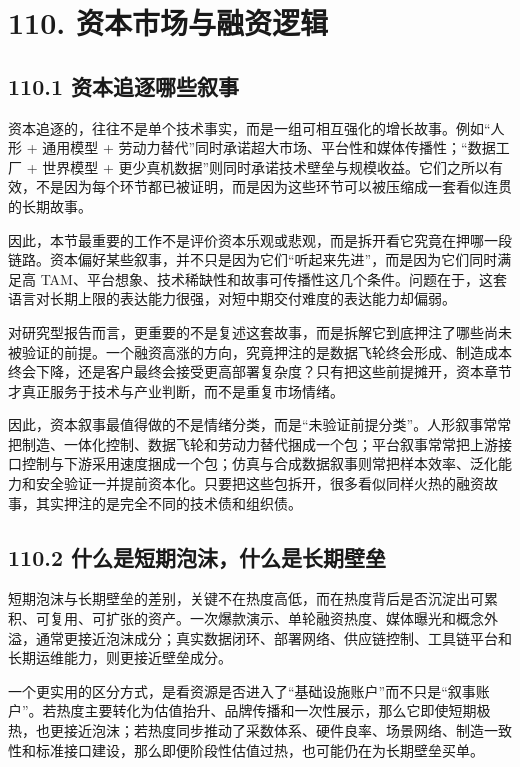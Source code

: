 \chapter*{110. 资本市场与融资逻辑}

\section*{110.1 资本追逐哪些叙事}


资本追逐的，往往不是单个技术事实，而是一组可相互强化的增长故事。例如“人形 + 通用模型 + 劳动力替代”同时承诺超大市场、平台性和媒体传播性；“数据工厂 + 世界模型 + 更少真机数据”则同时承诺技术壁垒与规模收益。它们之所以有效，不是因为每个环节都已被证明，而是因为这些环节可以被压缩成一套看似连贯的长期故事。

因此，本节最重要的工作不是评价资本乐观或悲观，而是拆开看它究竟在押哪一段链路。资本偏好某些叙事，并不只是因为它们“听起来先进”，而是因为它们同时满足高 TAM、平台想象、技术稀缺性和故事可传播性这几个条件。问题在于，这套语言对长期上限的表达能力很强，对短中期交付难度的表达能力却偏弱。

对研究型报告而言，更重要的不是复述这套故事，而是拆解它到底押注了哪些尚未被验证的前提。一个融资高涨的方向，究竟押注的是数据飞轮终会形成、制造成本终会下降，还是客户最终会接受更高部署复杂度？只有把这些前提摊开，资本章节才真正服务于技术与产业判断，而不是重复市场情绪。

因此，资本叙事最值得做的不是情绪分类，而是“未验证前提分类”。人形叙事常常把制造、一体化控制、数据飞轮和劳动力替代捆成一个包；平台叙事常常把上游接口控制与下游采用速度捆成一个包；仿真与合成数据叙事则常把样本效率、泛化能力和安全验证一并提前资本化。只要把这些包拆开，很多看似同样火热的融资故事，其实押注的是完全不同的技术债和组织债。

\section*{110.2 什么是短期泡沫，什么是长期壁垒}


短期泡沫与长期壁垒的差别，关键不在热度高低，而在热度背后是否沉淀出可累积、可复用、可扩张的资产。一次爆款演示、单轮融资热度、媒体曝光和概念外溢，通常更接近泡沫成分；真实数据闭环、部署网络、供应链控制、工具链平台和长期运维能力，则更接近壁垒成分。

一个更实用的区分方式，是看资源是否进入了“基础设施账户”而不只是“叙事账户”。若热度主要转化为估值抬升、品牌传播和一次性展示，那么它即使短期极热，也更接近泡沫；若热度同步推动了采数体系、硬件良率、场景网络、制造一致性和标准接口建设，那么即便阶段性估值过热，也可能仍在为长期壁垒买单。

